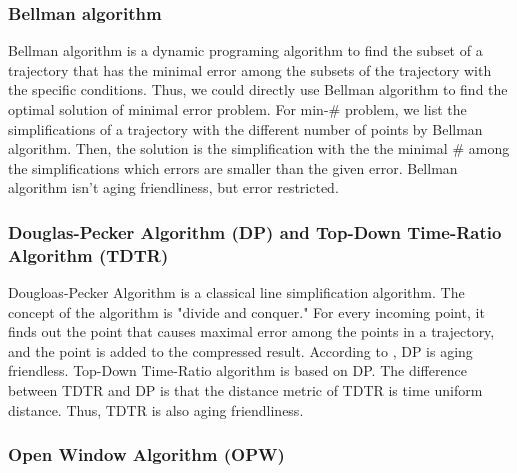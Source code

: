 \documentclass[12pt]{article}
\begin{document}
\begin{CJK}{UTF8}{bsmi}
\subsubsection{Bellman algorithm}

Bellman algorithm\cite{1961:Bellman} is a dynamic programing algorithm to find the subset of a trajectory that has the minimal error among the subsets of the trajectory with the specific conditions. Thus, we could directly use Bellman algorithm to find the optimal solution of minimal error problem. For min-\# problem, we list the simplifications of a trajectory with the different number of points by Bellman algorithm. Then, the solution is the simplification with the the minimal \# among the simplifications which errors are smaller than the given error. Bellman algorithm isn't aging friendliness\cite{2006:Cao}, but error restricted. 




\subsubsection{Douglas-Pecker Algorithm (DP) and Top-Down Time-Ratio Algorithm (TDTR)}


Dougloas-Pecker Algorithm \cite{1973:DP} is a classical line simplification algorithm. The concept of the algorithm is "divide and conquer." For every incoming point, it finds out the point that causes maximal error among the points in a trajectory, and the point is added to the compressed result. According to \cite{2006:Cao}, DP is aging friendless. Top-Down Time-Ratio algorithm is based on DP. The difference between TDTR and DP is that the distance metric of TDTR is time uniform distance. Thus, TDTR is also aging friendliness.




\subsubsection{Open Window Algorithm (OPW)}



\end{CJK}
\end{document}
